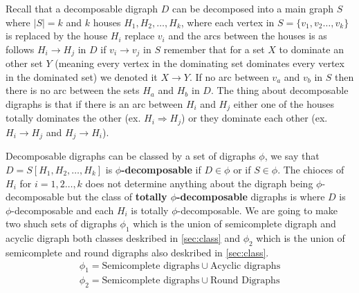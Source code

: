 Recall that a decomposable digraph $D$ can be decomposed into a main graph $S$ where $|S|=k$ and $k$ houses $H_1,H_2,\dots , H_k$, where each vertex in $S=\lbrace v_1,v_2\dots ,v_k\rbrace$ is replaced by the house $H_i$ replace $v_i$ and the arcs between the houses is as follows $H_i \rightarrow H_j$ in $D$ if $v_i\rightarrow v_j$ in $S$ remember that for a set $X$ to dominate an other set $Y$ (meaning every vertex in the dominating set dominates every vertex in the dominated set) we denoted it $X \rightarrow Y$. If no arc between $v_a$ and $v_b$ in $S$ then there is no arc between the sets $H_a$ and $H_b$ in $D$. 
The thing about decomposable digraphs is that if there is an arc between $H_i$ and $H_j$ either one of the houses totally dominates the other (ex. $H_i \Rightarrow H_j$) or they dominate each other (ex. $H_i \rightarrow H_j$ and $H_j\rightarrow H_i$).

Decomposable digraphs can be classed by a set of digraphs $\phi$, we say that $D=S[H_1,H_2,\dots ,H_k]$ is \textbf{$\phi$-decomposable} if $D\in \phi$ or if $S\in \phi$. The chioces of $H_i$ for $i=1,2\dots , k$ does not determine anything about the digraph being $\phi$-decomposable but the class of \textbf{totally $\phi$-decomposable} digraphs is where $D$ is $\phi$-decomposable and each $H_i$ is totally $\phi$-decomposable. 
We are going to make two shuch sets of digraphs $\phi_1$ which is the union of semicomplete digraph and acyclic digraph both classes deskribed in \autoref{sec:class} and $\phi_2$ which is the union of semicomplete and round digraphs also deskribed in \autoref{sec:class}.  
\begin{align}
    \phi_1=\text{Semicomplete digraphs}\cup \text{Acyclic digraphs}
    \label{eq:phi1}\\
    \phi_2=\text{Semicomplete digraphs}\cup \text{Round Digraphs}
    \label{eq:phi2}
\end{align}
